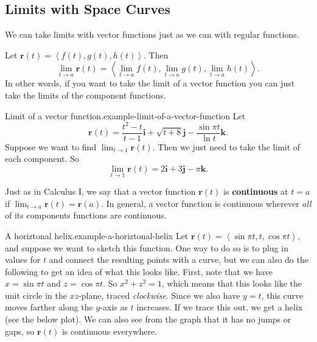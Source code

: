 \documentclass[10pt,]{book}
\newcommand{\terminology}[1]{\textbf{#1}}
\numberwithin{equation}{section}
\newcommand{\vv}[1]{\mathbf{#1}}
\newcommand{\dotprod}[1]{\left\langle #1 \right\rangle}
\begin{document}
\subsection[{Limits with Space Curves}]{Limits with Space Curves}\label{limits-with-space-curves}
\hypertarget{p-1251}{}%
We can take limits with vector functions just as we can with regular functions.%
\par
\hypertarget{p-1252}{}%
Let \(\vv{r}(t) = \dotprod{f(t),g(t),h(t)}\). Then%
%
\begin{equation}
\lim_{t\to a}\vv{r}(t) = \dotprod{\lim_{t\to a}f(t),\lim_{t\to a}g(t),\lim_{t\to a}h(t)}.\label{limits-vector-functions}
\end{equation}
\hypertarget{p-1253}{}%
In other words, if you want to take the limit of a vector function you can just take the limits of the component functions.%
\begin{example}{Limit of a vector function.}{example-limit-of-a-vector-function}%
\hypertarget{p-1254}{}%
Let%
%
\begin{equation*}
\vv{r}(t) = \frac{t^{2}-t}{t-1}\vv{i} + \sqrt{t+8}\vv{j} - \frac{\sin\pi t}{\ln t}\vv{k}.
\end{equation*}
\hypertarget{p-1255}{}%
Suppose we want to find \(\lim_{t\to 1}\vv{r}(t)\). Then we just need to take the limit of each component. So%
%
\begin{equation*}
\lim_{t\to1}\vv{r}(t) = 2\vv{i}+3\vv{j} -\pi\vv{k}.
\end{equation*}
\end{example}
\hypertarget{p-1256}{}%
Just as in Calculus I, we say that a vector function \(\vv{r}(t)\) is \terminology{continuous} at \(t=a\) if \(\lim_{t\to a}\vv{r}(t) = \vv{r}(a)\). In general, a vector function is continuous wherever \emph{all} of its components functions are continuous.%
\begin{example}{A horiztonal helix.}{example-a-horiztonal-helix}%
\hypertarget{p-1257}{}%
Let \(\vv{r}(t) = \dotprod{\sin\pi t, t, \cos\pi t}\), and suppose we want to sketch this function. One way to do so is to plug in values for \(t\) and connect the resulting points with a curve, but we can also do the following to get an idea of what this looks like. First, note that we have \(x = \sin\pi t\) and \(z=\cos\pi t\). So \(x^{2}+z^{2} = 1\), which means that this looks like the unit circle in the \(xz\)-plane, traced \emph{clockwise}. Since we also have \(y=t\), this curve moves farther along the \(y\)-axis as \(t\) increases. If we trace this out, we get a helix (see the below plot). We can also see from the graph that it has no jumps or gaps, so \(\vv{r}(t)\) is continuous everywhere.%
\end{example}
\end{document}
